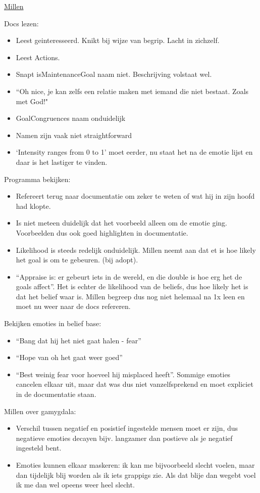 \documentclass[12pt,a4paper]{article}
\begin{document}
\underline{Millen}

Docs lezen:

\begin{itemize}
	\item Leest geinteresseerd. Knikt bij wijze van begrip. Lacht in zichzelf.
	\item Leest Actions.
	\item Snapt isMaintenanceGoal naam niet. Beschrijving volstaat wel.
	\item ``Oh nice, je kan zelfs een relatie maken met iemand die niet bestaat. Zoals met God!"
	\item GoalCongruences naam onduidelijk
	\item Namen zijn vaak niet straightforward
	\item `Intensity ranges from 0 to 1' moet eerder, nu staat het na de emotie lijst en daar is het lastiger te vinden.
\end{itemize}

Programma bekijken:

\begin{itemize}
	\item Refereert terug naar documentatie om zeker te weten of wat hij in zijn hoofd had klopte.
	\item Is niet meteen duidelijk dat het voorbeeld alleen om de emotie ging. Voorbeelden dus ook goed highlighten in documentatie.
	\item Likelihood is steeds redelijk onduidelijk. Millen neemt aan dat et is hoe likely het goal is om te gebeuren. (bij adopt).
	\item ``Appraise is: er gebeurt iets in de wereld, en die double is hoe erg het de goals affect''. Het is echter de likelihood van de beliefs, dus hoe likely het is dat het belief waar is. Millen begreep dus nog niet helemaal na 1x leen en moet nu weer naar de docs refereren.
\end{itemize}

Bekijken emoties in belief base:

\begin{itemize}
	\item ``Bang dat hij het niet gaat halen - fear''
	\item ``Hope van oh het gaat weer goed''
	\item ``Best weinig fear voor hoeveel hij misplaced heeft''. Sommige emoties cancelen elkaar uit, maar dat was dus niet vanzelfsprekend en moet expliciet in de documentatie staan.
\end{itemize}

Millen over gamygdala:

\begin{itemize}
	\item Verschil tussen negatief en posistief ingestelde mensen moet er zijn, dus negatieve emoties decayen bijv. langzamer dan postieve als je negatief ingesteld bent.
	\item Emoties kunnen elkaar maskeren: ik kan me bijvoorbeeld slecht voelen, maar dan tijdelijk blij worden als ik iets grappigs zie. Als dat blije dan wegebt voel ik me dan wel opeens weer heel slecht. 
\end{itemize}
\end{document}
